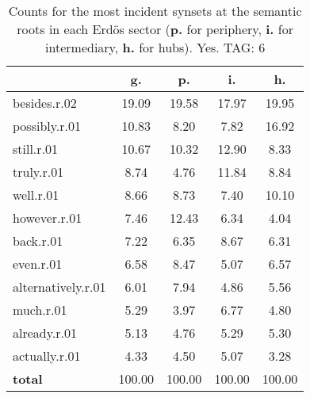 \begin{table}[h!]
\begin{center}
\begin{tabular}{| l | c | c | c | c |}\hline
 & g. & p. & i. & h. \\\hline
besides.r.02 & 19.09  & 19.58  & 17.97  & 19.95 \\\hline
possibly.r.01 & 10.83  & 8.20  & 7.82  & 16.92 \\\hline
still.r.01 & 10.67  & 10.32  & 12.90  & 8.33 \\\hline
truly.r.01 & 8.74  & 4.76  & 11.84  & 8.84 \\\hline
well.r.01 & 8.66  & 8.73  & 7.40  & 10.10 \\\hline
however.r.01 & 7.46  & 12.43  & 6.34  & 4.04 \\\hline
back.r.01 & 7.22  & 6.35  & 8.67  & 6.31 \\\hline
even.r.01 & 6.58  & 8.47  & 5.07  & 6.57 \\\hline
alternatively.r.01 & 6.01  & 7.94  & 4.86  & 5.56 \\\hline
much.r.01 & 5.29  & 3.97  & 6.77  & 4.80 \\\hline
already.r.01 & 5.13  & 4.76  & 5.29  & 5.30 \\\hline
actually.r.01 & 4.33  & 4.50  & 5.07  & 3.28 \\\hline
{{\bf total}} & 100.00  & 100.00  & 100.00  & 100.00 \\\hline
\end{tabular}
\caption{Counts for the most incident synsets at the semantic roots in each Erd\"os sector ({\bf p.} for periphery, {\bf i.} for intermediary, {\bf h.} for hubs). Yes. TAG: 6}
\end{center}
\end{table}